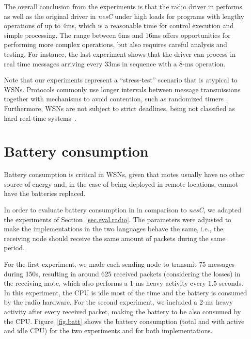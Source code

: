 
The overall conclusion from the experiments is that the radio driver in \CEU 
performs as well as the original driver in \emph{nesC} under high loads for 
programs with lengthy operations of up to 4ms, which is a reasonable time for 
control execution and simple processing.
%
The range between 6ms and 16ms offers opportunities for performing more complex 
operations, but also requires careful analysis and testing.
%
For instance, the last experiment shows that the \CEU driver can process in 
real time messages arriving every 33ms in sequence with a 8-ms operation.
%

Note that our experiments represent a ``stress-test'' scenario that is atypical 
to WSNs.
Protocols commonly use longer intervals between message transmissions together 
with mechanisms to avoid contention, such as randomized 
timers~\cite{wsn.trickle,wsn.ctp}.
Furthermore, WSNs are not subject to strict deadlines, being not classified as 
hard real-time systems~\cite{wsn.decade}.

\section{Battery consumption}
\label{sec.eval.batt}

Battery consumption is critical in WSNs, given that motes usually have no other 
source of energy and, in the case of being deployed in remote locations, cannot 
have the batteries replaced.

In order to evaluate battery consumption in \CEU in comparison to \emph{nesC}, 
we adapted the experiments of Section~\ref{sec.eval.radio}.
%
The parameters were adjusted to make the implementations in the two languages 
behave the same, i.e., the receiving node should receive the same amount of 
packets during the same period.

For the first experiment, we made each sending node to transmit 75 messages 
during 150s, resulting in around 625 received packets (considering the losses) 
in the receiving mote, which also performs a 1-ms heavy activity every 1.5 
seconds.
%
In this experiment, the CPU is idle most of the time and the battery is 
consumed by the radio hardware.
%
For the second experiment, we included a 2-ms heavy activity after every 
received packet, making the battery to be also consumed by the CPU.
%
Figure~\ref{fig.batt} shows the battery consumption (total and with active and 
idle CPU) for the two experiments and for both implementations.

